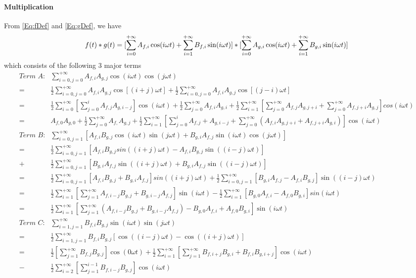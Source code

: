 \documentclass[12pt]{article}
\begin{document}
\paragraph{Multiplication}\label{App-Para:Multiplication}
From \autoref{Eq:fDef} and \autoref{Eq:gDef}, we have
\begin{equation}
	f(t)*g(t)=[\sum_{i=0}^{+\infty}A_{f, i}\cos(i\omega t)+\sum_{i=1}^{+\infty}B_{f, i}\sin(i\omega t)]*[\sum_{i=0}^{+\infty}A_{g, i}\cos(i\omega t)+\sum_{i=1}^{+\infty}B_{g, i}\sin(i\omega t)]\\
\end{equation}
which consists of the following 3 major terms
\begin{equation}
	\begin{aligned}
	\textit{Term A:} &\sum_{i=0, j=0}^{+\infty}A_{f,i}A_{g,j}\cos(i\omega t)\cos(j\omega t)\\
	=&\frac{1}{2}\sum_{i=0, j=0}^{+\infty}A_{f, i}A_{g, j}\cos[(i+j)\omega t] + \frac{1}{2}\sum_{i=0, j=0}^{+\infty}A_{f, i}A_{g, j}\cos[(j-i)\omega t]\\
	=&\frac{1}{2}\sum_{i=0}^{+\infty}[\sum_{j=0}^{i}A_{f,j}A_{g,i-j}]\cos(i\omega t)+\frac{1}{2}\sum_{j=0}^{+\infty}A_{f,i}A_{g,i}+\frac{1}{2}\sum_{i=1}^{+\infty}[\sum_{j=0}^{+\infty}A_{f, j}A_{g, j+i}+\sum_{j=0}^{+\infty}A_{f, j+i}A_{g, j}]cos(i\omega t)\\
	=&A_{f,0}A_{g,0}+\frac{1}{2}\sum_{j=0}^{+\infty}A_{f,}A_{g,j}+\frac{1}{2}\sum_{i=1}^{+\infty}[\sum_{j=0}^{i}A_{f,j}+A_{g,i-j}+\sum_{j=0}^{+\infty}(A_{f,i}A_{g,j+i}+A_{f,j+i}A_{g,i})]\cos(i\omega t)\\
	\textit{Term B:} &\sum_{i=0,j=1}^{+\infty}[A_{f,i}B_{g,j}\cos(i\omega t)\sin(j\omega t)+B_{g,i}A_{f,j}\sin(i\omega t)\cos(j\omega t)]\\
	=&\frac{1}{2}\sum_{i=0,j=1}^{+\infty}[A_{f,i}B_{g,j}sin((i+j)\omega t)-A_{f,i}B_{g,j}\sin((i-j)\omega t)]\\+&\frac{1}{2}\sum_{i=0,j=1}^{+\infty}[B_{g,i}A_{f,j}\sin((i+j)\omega t)+B_{g,i}A_{f,j}\sin((i-j)\omega t)]\\
	=&\frac{1}{2}\sum_{i=0,j=1}^{+\infty}[A_{f,i}B_{g,j}+B_{g,i}A_{f,j}]sin((i+j)\omega t)+\frac{1}{2}\sum_{i=0,j=1}^{+\infty}[B_{g,i}A_{f,j}-A_{f,i}B_{g,j}]\sin((i-j)\omega t)\\
	=&\frac{1}{2}\sum_{i=1}^{+\infty}[\sum_{j=1}^{+\infty}A_{f,i-j}B_{g,j}+B_{g,i-j}A_{f,j}]\sin(i\omega t)-\frac{1}{2}\sum_{i=1}^{+\infty}[B_{g,0}A_{f,i}-A_{f,0}B_{g,i}]sin(i\omega t)\\
	=&\frac{1}{2}\sum_{i=1}^{+\infty}[\sum_{j=1}^{+\infty}(A_{f,i-j}B_{g,j}+B_{g,i-j}A_{f,j})-B_{g,0}A_{f,i}+A_{f,0}B_{g,i}]\sin(i\omega t)\\
	\textit{Term C:} &\sum_{i=1,j=1}^{+\infty}B_{f,i}B_{g,j}\sin(i\omega t)\sin(j\omega t)\\
	=&\frac{1}{2}\sum_{i=1,j=1}^{+\infty}B_{f,i}B_{g,j}[\cos((i-j)\omega t)-\cos((i+j)\omega t)]\\
	=&\frac{1}{2}[\sum_{j=1}^{+\infty}B_{f,j}B_{g,j}]\cos(0\omega t)+\frac{1}{2}\sum_{i=1}^{+\infty}[\sum_{j=1}^{+\infty}B_{f,i+j}B_{g,i}+B_{f,i}B_{g,i+j}]\cos(i\omega t)\\-&\frac{1}{2}\sum_{i=2}^{+\infty}[\sum_{j=1}^{i-1}B_{f,i-j}B_{g,j}]\cos(i\omega t)
	\end{aligned}
\end{equation}
\end{document}
